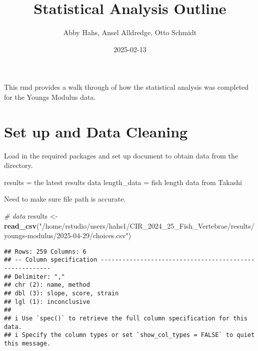 \documentclass[
]{article}
\title{Statistical Analysis Outline}
\author{Abby Hahs, Ansel Alldredge, Otto Schmidt}
\date{2025-02-13}
\newenvironment{Shaded}{\begin{snugshade}}{\end{snugshade}}
\newcommand{\CommentTok}[1]{\textcolor[rgb]{0.56,0.35,0.01}{\textit{#1}}}
\newcommand{\FunctionTok}[1]{\textcolor[rgb]{0.13,0.29,0.53}{\textbf{#1}}}
\newcommand{\NormalTok}[1]{#1}
\newcommand{\OtherTok}[1]{\textcolor[rgb]{0.56,0.35,0.01}{#1}}
\newcommand{\StringTok}[1]{\textcolor[rgb]{0.31,0.60,0.02}{#1}}
\begin{document}
\maketitle

This rmd provides a walk through of how the statistical analysis was
completed for the Youngs Modulus data.

\section{Set up and Data Cleaning}\label{set-up-and-data-cleaning}

Load in the required packages and set up document to obtain data from
the directory.

results = the latest results data length\_data = fish length data from
Takashi

Need to make sure file path is accurate.

\begin{Shaded}
\begin{Highlighting}[]
\CommentTok{\# data}
\NormalTok{results }\OtherTok{\textless{}{-}} \FunctionTok{read\_csv}\NormalTok{(}\StringTok{"/home/rstudio/users/hahs1/CIR\_2024\_25\_Fish\_Vertebrae/results/youngs{-}modulus/2025{-}04{-}29/choices.csv"}\NormalTok{)}
\end{Highlighting}
\end{Shaded}

\begin{verbatim}
## Rows: 259 Columns: 6
## -- Column specification --------------------------------------------------------
## Delimiter: ","
## chr (2): name, method
## dbl (3): slope, score, strain
## lgl (1): inconclusive
## 
## i Use `spec()` to retrieve the full column specification for this data.
## i Specify the column types or set `show_col_types = FALSE` to quiet this message.
\end{verbatim}
\end{document}
